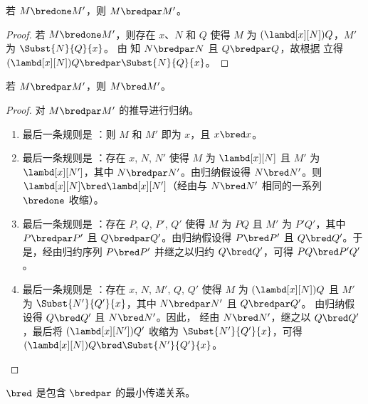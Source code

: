 \documentclass[../../../include/open-logic-section]{subfiles}
\begin{document}


\begin{lem}
  若 $M \bredone M'$，则 $M \bredpar M'$。
\end{lem}

\begin{proof}
若 $M \bredone M'$，则存在 $x$、$N$ 和 $Q$ 使得 $M$ 为 $(\lambd[x][N])Q$，$M'$ 为 $\Subst{N}{Q}{x}$。
由  知 $N \bredpar N$ 且 $Q \bredpar Q$，故根据  立得 $(\lambd[x][N])Q
    \bredpar \Subst{N}{Q}{x}$。
\end{proof}

\begin{lem}
  若 $M \bredpar M'$，则 $M \bred M'$。
\end{lem}

\begin{proof} 对 $M \bredpar M'$ 的推导进行归纳。
  \begin{enumerate}
  \item 最后一条规则是 ：则 $M$ 和 $M'$
    即为 $x$，且 $x \bred x$。
  \item 最后一条规则是 ：存在 $x$, $N$, $N'$ 使得 $M$ 为
    $\lambd[x][N]$ 且 $M'$ 为 $\lambd[x][N']$，其中
    $N \bredpar N'$。由归纳假设得 $N \bred N'$。则
    $\lambd[x][N] \bred \lambd[x][N']$（经由与 $N \bred N'$ 相同的一系列
    $\bredone$ 收缩）。
  \item 最后一条规则是 ：存在 $P$, $Q$, $P'$, $Q'$ 使得 $M$ 为
    $PQ$ 且 $M'$ 为 $P'Q'$，其中 $P \bredpar P'$
    且 $Q \bredpar Q'$。由归纳假设得 $P \bred P'$ 且 $Q \bred
    Q'$。于是，经由归约序列 $P \bred P'$ 并继之以归约 $Q \bred Q'$，可得 $PQ \bred P'Q'$。
  \item 最后一条规则是 ：存在 $x$,
    $N$, $M'$, $Q$, $Q'$ 使得 $M$ 为
    $(\lambd[x][N])Q$ 且 $M'$ 为 $\Subst{N'}{Q'}{x}$，其中 $N \bredpar N'$ 且 $Q \bredpar Q'$。
    由归纳假设得 $Q \bred Q'$ 且 $N \bred N'$。因此，
    经由 $N \bred N'$，继之以 $Q \bred Q'$，最后将 $(\lambd[x][N'])Q'$ 收缩为
    $\Subst{N'}{Q'}{x}$，可得 $(\lambd[x][N])Q \bred \Subst{N'}{Q'}{x}$。
  \end{enumerate}
\end{proof}

\begin{lem}
  $\bred$ 是包含 $\bredpar$ 的最小传递关系。
\end{lem}
\end{document}

